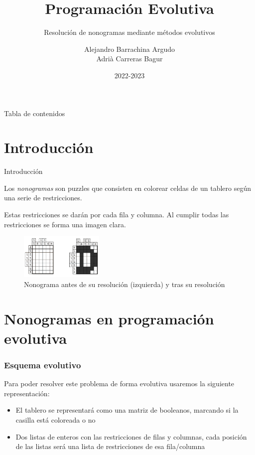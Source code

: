\documentclass{beamer}
\title{Programación Evolutiva}
\subtitle{Resolución de nonogramas mediante métodos evolutivos}
\date{2022-2023}
\author{Alejandro Barrachina Argudo \\ Adrià Carreras Bagur}
\institute{Universidad Complutense de Madrid}
\begin{document}
\maketitle

\begin{frame}{Tabla de contenidos}
    \tableofcontents
\end{frame}

\section{Introducción}
\begin{frame}{Introducción}

    Los \textit{nonogramas} son puzzles que consisten en colorear celdas de un tablero según una serie de restricciones.

    Estas restricciones se darán por cada fila y columna. Al cumplir todas las restricciones se forma una imagen clara.
    \begin{figure}
        \centering
        \includegraphics[width=4cm]{Images/nonograma.png}
        \caption{ Nonograma antes de su resolución (izquierda) y tras su resolución}
    \end{figure}

\end{frame}
\section{Nonogramas en programación evolutiva}
\begin{frame}
    \frametitle{Esquema evolutivo}

    Para poder resolver este problema de forma evolutiva usaremos la siguiente representación:
    \begin{itemize}
        \item <1-> El tablero se representará como una matriz de booleanos, marcando si la casilla está coloreada o no
        \item <2-> Dos listas de enteros con las restricciones de filas y columnas, cada posición de las listas será una lista de restricciones de esa fila/columna
    \end{itemize}

\end{frame}
\end{document}
